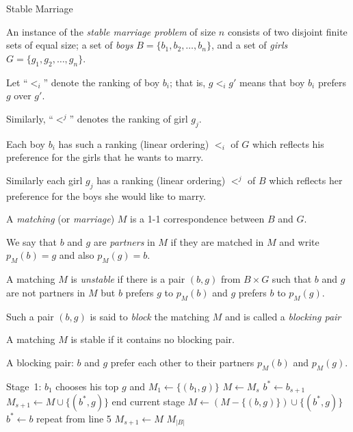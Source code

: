 \begin{frame}
{Stable Marriage}

An instance of the {\em stable marriage problem}
of size $n$ consists
of two disjoint finite sets of equal size; a set of {\em boys}
$B=\{b_1,b_2,\ldots,b_n\}$, and a set of {\em girls}
$G=\{g_1,g_2,\ldots,g_n\}$.

Let ``$<_i$'' denote the ranking of boy $b_i$; that is, $g<_ig'$ means
that boy $b_i$ prefers $g$ over $g'$.  

Similarly, ``$<^j$'' denotes
the ranking of girl $g_j$.

Each boy $b_i$ has such a ranking (linear
ordering) $<_i$ of $G$ which reflects his preference for the girls that
he wants to marry.

Similarly each girl $g_j$ has a ranking
(linear ordering) $<^j$ of $B$ which reflects her preference for the
boys she would like to marry.
\end{frame}

\begin{frame}
A {\em matching} (or {\em marriage}) $M$ is a 1-1 correspondence
between $B$ and $G$.  

We say that $b$ and $g$ are {\em partners} in
$M$ if they are matched in $M$ and write $p_M(b)=g$ and also
$p_M(g)=b$.   

A matching $M$ is {\em unstable}
if there is a pair
$(b,g)$ from $B\times G$ such that $b$ and $g$ are not partners in $M$
but $b$ prefers $g$ to $p_M(b)$ and $g$ prefers $b$ to $p_M(g)$.  

Such
a pair $(b,g)$ is said to {\em block} 
the matching $M$ and is called a
{\em blocking pair}

A matching
$M$ is stable if it contains no blocking pair.
\end{frame}

\begin{frame}
\begin{center}
\begin{minipage}{4cm}
\end{minipage}
\end{center}
A blocking pair: $b$ and $g$ prefer each other to their
partners $p_M(b)$ and $p_M(g)$.
\end{frame}

\begin{frame}
\begin{algorithmic}[1]
\STATE Stage~1: $b_1$ chooses his top $g$ and
$M_1\longleftarrow\{(b_1,g)\}$
\STATE $M\longleftarrow M_s$
\STATE $b^*\longleftarrow b_{s+1}$
\STATE $M_{s+1}\longleftarrow M\cup\{(b^*,g)\}$
\STATE end current stage
\STATE $M\longleftarrow (M-\{(b,g)\})\cup\{(b^*,g)\}$
\STATE $b^*\longleftarrow b$
\STATE repeat from line 5
\ENDIF
\ENDFOR
\STATE $M_{s+1}\longleftarrow M$
\ENDFOR
\RETURN $M_{|B|}$
\end{algorithmic}
\end{frame}

